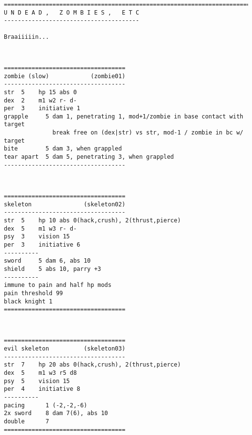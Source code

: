 \pagebreak[2]
\tiny \begin{samepage} \begin{verbatim}
================================================================================
U N D E A D ,   Z O M B I E S ,   E T C
---------------------------------------

Braaiiiiin...
\end{verbatim} \end{samepage} \normalsize

\

\pagebreak[1]
\tiny \begin{samepage} \begin{verbatim}
===================================
zombie (slow)            (zombie01)
-----------------------------------
str  5    hp 15 abs 0
dex  2    m1 w2 r- d-
per  3    initiative 1
grapple     5 dam 1, penetrating 1, mod+1/zombie in base contact with target
              break free on (dex|str) vs str, mod-1 / zombie in bc w/ target
bite        5 dam 3, when grappled
tear apart  5 dam 5, penetrating 3, when grappled
-----------------------------------
\end{verbatim} \end{samepage} \normalsize

\

\pagebreak[1]
\tiny \begin{samepage} \begin{verbatim}
===================================
skeleton               (skeleton02)
-----------------------------------
str  5    hp 10 abs 0(hack,crush), 2(thrust,pierce)
dex  5    m1 w3 r- d-
psy  3    vision 15
per  3    initiative 6
----------
sword     5 dam 6, abs 10
shield    5 abs 10, parry +3
----------
immune to pain and half hp mods
pain threshold 99
black knight 1
===================================
\end{verbatim} \end{samepage} \normalsize

\

\pagebreak[1]
\tiny \begin{samepage} \begin{verbatim}
===================================
evil skeleton          (skeleton03)
-----------------------------------
str  7    hp 20 abs 0(hack,crush), 2(thrust,pierce)
dex  5    m1 w3 r5 d8
psy  5    vision 15
per  4    initiative 8
----------
pacing      1 (-2,-2,-6)
2x sword    8 dam 7(6), abs 10
double      7
===================================
\end{verbatim} \end{samepage} \normalsize

